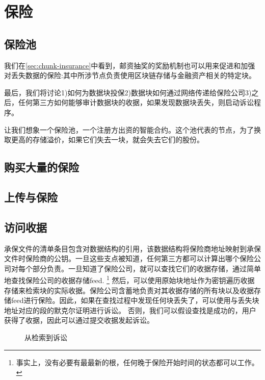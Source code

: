 \section{保险\statusorange}\label{sec:insurance}
 

\subsection{保险池\statusorange}
我们在\ref{sec:chunk-insurance}中看到，邮资抽奖的奖励机制也可以用来促进和加强对丢失数据的保险:其中所涉节点负责使用区块链存储与金融资产相关的特定块。

最后，我们将讨论1)如何为数据块投保2)数据块如何通过网络传递给保险公司3)之后，任何第三方如何能够审计数据块的收据，如果发现数据块丢失，则启动诉讼程序。

让我们想象一个保险池，一个注册方出资的智能合约。这个池代表的节点，为了换取更高的存储溢价，如果它们失去一块，就会失去它们的股份。 

\subsection{购买大量的保险}

\subsection{上传与保险\statusred}


\subsection{访问收据\statusred}

承保文件的清单条目包含对数据结构的引用，该数据结构将保险商地址映射到承保文件时保险商的公钥。一旦这些支点被知道，任何第三方都可以计算出哪个保险公司对每个部分负责。一旦知道了保险公司，就可以查找它们的收据存储，通过简单地查找保险公司的收据存储feed.%
%
\footnote{事实上，没有必要有最最新的根，任何晚于保险开始时间的状态都可以工作。}
%
然后，可以使用原始块地址作为密钥遍历收据存储来检索块的实际收据。保险公司含蓄地负责对其收据存储的所有块以及收据存储feed进行保险。因此，如果在查找过程中发现任何块丢失了，可以使用与丢失块地址对应的段的默克尔证明进行诉讼。 
否则，我们可以假设查找是成功的，用户获得了收据，因此可以通过提交收据发起诉讼。 


\begin{figure}[htbp]
  \centering
  \caption[从检索到诉讼]{从检索到诉讼}
  \label{fig:flowchart-retrieval-litigation}
\end{figure}


